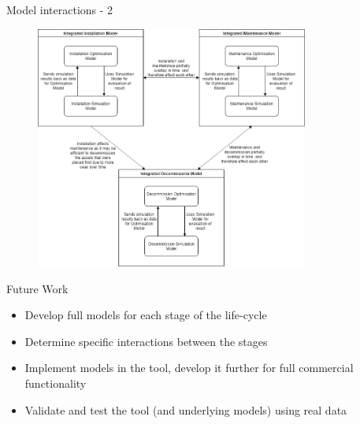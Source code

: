\documentclass{beamer}
\begin{document}
\begin{frame}{Model interactions - 2}
\begin{figure}[t]
  \includegraphics[width=0.8\textwidth]{flowchart}
\centering
\end{figure}
\end{frame}


\begin{frame}{Future Work}
   \begin{itemize}
  	\item Develop full models for each stage of the life-cycle
  	\item Determine specific interactions between the stages
  	\item Implement models in the tool, develop it further for full commercial functionality
  	\item Validate and test the tool (and underlying models) using real data
  \end{itemize}
\end{frame}
\end{document}
